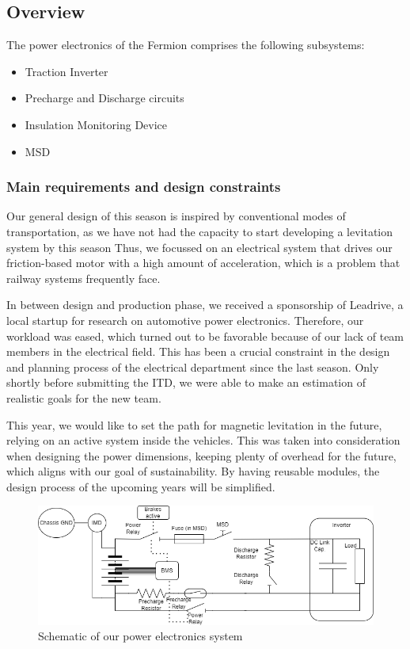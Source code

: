 \subsection{Overview}
The power electronics of the Fermion comprises the following subsystems:
\begin{itemize}
    \item Traction Inverter
    \item Precharge and Discharge circuits
    \item Insulation Monitoring Device   
    \item MSD
\end{itemize}

\subsubsection*{Main requirements and design constraints}
\par Our general design of this season is inspired by conventional modes of transportation,
as we have not had the capacity to start developing a levitation system by this season
Thus, we focussed on an electrical system that drives our friction-based motor with
a high amount of acceleration, which is a problem that railway systems frequently face.

\par In between design and production phase, we received a sponsorship of Leadrive,
a local startup for research on automotive power electronics.
Therefore, our workload was eased, which turned out to be favorable
because of our lack of team members in the electrical field. This has been a crucial
constraint in the design and planning process of the electrical department
since the last season. Only shortly before submitting the ITD, we were able to make an estimation of
realistic goals for the new team.

\par This year, we would like to set the path for magnetic levitation in the future, relying on an active system
inside the vehicles. This was taken into consideration when designing the power dimensions,
keeping plenty of overhead for the future, which aligns with our goal of sustainability.
By having reusable modules, the design process of the upcoming years will be simplified.
\begin{figure}[ht]
    \centering
    \includegraphics[width=\linewidth]{texfiles/elec/eimg/HVSchematic}
    \caption{Schematic of our power electronics system}
    \label{fig:HVSchematic}
\end{figure}

